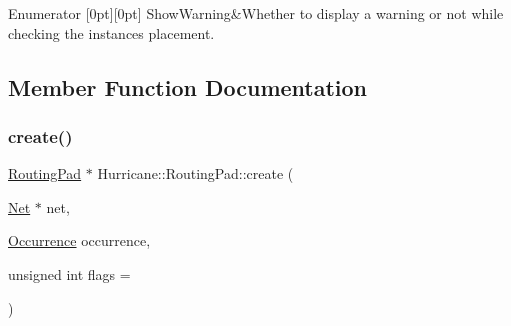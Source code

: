 \begin{DoxyEnumFields}{Enumerator}
[0pt][0pt]{}\mbox{\label{classHurricane_1_1RoutingPad_a69f37f0b06b9bfd758d9be42c71e2bd4a8fd74358022a29aab828700c8f7347ba}} 
Show\+Warning&Whether to display a warning or not while checking the instances placement. \\
\hline

\end{DoxyEnumFields}


\subsection{Member Function Documentation}
\mbox{\label{classHurricane_1_1RoutingPad_a87c3a286477f81b9c791dc24104a3e51}} 
\subsubsection{\texorpdfstring{create()}{create()}\hspace{0.1cm}{\footnotesize\ttfamily [1/2]}}
{\footnotesize\ttfamily \mbox{\hyperlink{classHurricane_1_1RoutingPad}{Routing\+Pad}} $\ast$ Hurricane\+::\+Routing\+Pad\+::create (\begin{DoxyParamCaption}\item[{\mbox{\hyperlink{classHurricane_1_1Net}{Net}} $\ast$}]{net,  }\item[{\mbox{\hyperlink{classHurricane_1_1Occurrence}{Occurrence}}}]{occurrence,  }\item[{unsigned int}]{flags = {} }\end{DoxyParamCaption})\hspace{0.3cm}{\ttfamily [static]}}


